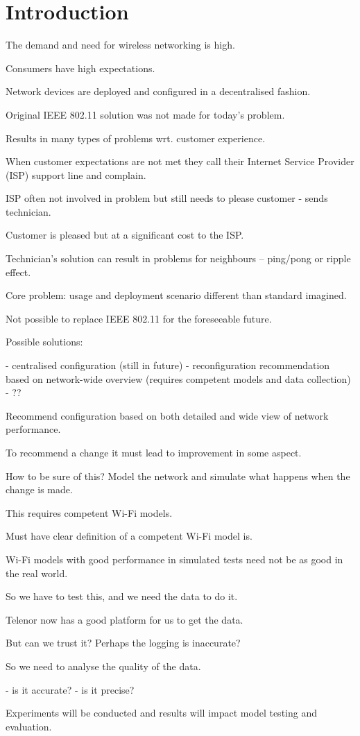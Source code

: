 \chapter{Introduction}

The demand and need for wireless networking is high. 

Consumers have high expectations.

Network devices are deployed and configured in a decentralised fashion. 

Original IEEE 802.11 solution was not made for today's problem.

Results in many types of problems wrt. customer experience. 

When customer expectations are not met they call their Internet Service Provider (ISP) support line and complain.

ISP often not involved in problem but still needs to please customer - sends technician.

Customer is pleased but at a significant cost to the ISP.

Technician's solution can result in problems for neighbours -- ping/pong or ripple effect.

Core problem: usage and deployment scenario different than standard imagined.

Not possible to replace IEEE 802.11 for the foreseeable future.

Possible solutions: 

 - centralised configuration (still in future)
 - reconfiguration recommendation based on network-wide overview (requires competent models and data collection)
 - ??

Recommend configuration based on both detailed and wide view of network performance.

To recommend a change it must lead to improvement in some aspect.

How to be sure of this? Model the network and simulate what happens when the change is made.

This requires competent Wi-Fi models.

Must have clear definition of a competent Wi-Fi model is.

Wi-Fi models with good performance in simulated tests need not be as good in the real world.

So we have to test this, and we need the data to do it.

Telenor now has a good platform for us to get the data.

But can we trust it? Perhaps the logging is inaccurate?

So we need to analyse the quality of the data.

 - is it accurate?
 - is it precise?

Experiments will be conducted and results will impact model testing and evaluation.


